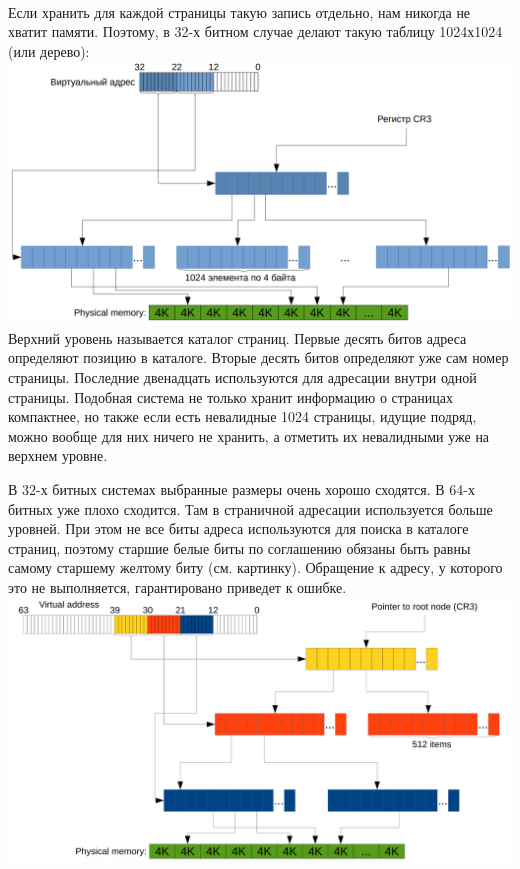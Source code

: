 \documentclass[12pt, a4paper]{article}
\begin{document}
	\\\par Если хранить для каждой страницы такую запись отдельно, нам никогда не хватит памяти. Поэтому, в 32-х битном случае делают такую таблицу 1024х1024 (или дерево):\\
	\includegraphics[scale=0.35]{virtual_memory_on_32.png}\\
	Верхний уровень называется каталог страниц. Первые десять битов адреса определяют позицию в каталоге. Вторые десять битов определяют уже сам номер страницы. Последние двенадцать используются для адресации внутри одной страницы. Подобная система не только хранит информацию о страницах компактнее, но также если есть невалидные 1024 страницы, идущие подряд, можно вообще для них ничего не хранить, а отметить их невалидными уже на верхнем уровне.
	\\\par В 32-х битных системах выбранные размеры очень хорошо сходятся. В 64-х битных уже плохо сходится. Там в страничной адресации используется больше уровней. При этом не все биты адреса используются для поиска в каталоге страниц, поэтому старшие белые биты по соглашению обязаны быть равны самому старшему желтому биту (см. картинку). Обращение к адресу, у которого это не выполняется, гарантировано приведет к ошибке. \\
	\includegraphics[scale=0.4]{virtual_memory_on_64.png}\\
\end{document}
